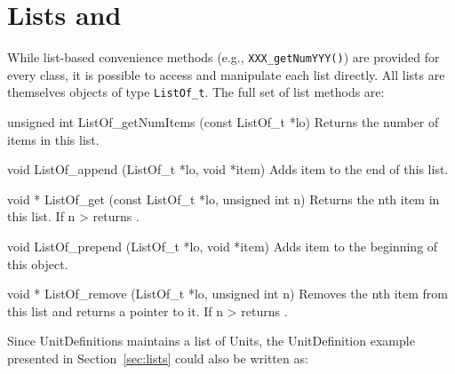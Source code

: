 \documentclass{sbmlmanual}
\begin{document}



\clearpage
\appendix
\section{Lists and }
\label{app:lists}

While list-based convenience methods (e.g., \texttt{XXX\_getNumYYY()}) are
provided for every class, it is possible to access and manipulate each list
directly.  All lists are themselves objects of type \texttt{ListOf\_t}.
The full set of list methods are:


\begin{methoddef}{unsigned int ListOf\_getNumItems (const ListOf\_t *lo)}
  Returns the number of items in this list.
\end{methoddef}


\begin{methoddef}{void ListOf\_append (ListOf\_t *lo, void *item)}
  Adds item to the end of this list.
\end{methoddef}


\begin{methoddef}{void * ListOf\_get (const ListOf\_t *lo, unsigned int n)}
  Returns the nth item in this list.  If n > 
  returns .
\end{methoddef}


\begin{methoddef}{void ListOf\_prepend (ListOf\_t *lo, void *item)}
  Adds item to the beginning of this  object.
\end{methoddef}


\begin{methoddef}{void * ListOf\_remove (ListOf\_t *lo, unsigned int n)}
  Removes the nth item from this list and returns a pointer to it.  If n >
   returns .
\end{methoddef}


Since UnitDefinitions maintains a list of Units, the UnitDefinition
example presented in Section~\ref{sec:lists} could also be written as:
\end{document}
